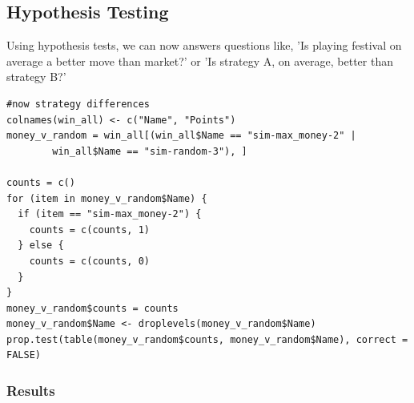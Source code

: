 \documentclass[11pt, oneside]{article}   	%
\begin{document}
\subsection{Hypothesis Testing}

Using hypothesis tests, we can now answers questions like, 'Is playing festival on average a better move than market?' or 'Is strategy A, on average, better than strategy B?'

\begin{verbatim}
#now strategy differences
colnames(win_all) <- c("Name", "Points")
money_v_random = win_all[(win_all$Name == "sim-max_money-2" | 
		win_all$Name == "sim-random-3"), ]

counts = c()
for (item in money_v_random$Name) {
  if (item == "sim-max_money-2") {
    counts = c(counts, 1)
  } else {
    counts = c(counts, 0)
  }
}
money_v_random$counts = counts
money_v_random$Name <- droplevels(money_v_random$Name)
prop.test(table(money_v_random$counts, money_v_random$Name), correct = FALSE)
\end{verbatim}

\subsubsection{Results}

\begin{figure}[H] \centering
   \begin{minipage}{0.49\textwidth}
   \end{minipage}
   \begin {minipage}{0.49\textwidth}
   \end{minipage}
\end{figure}
\end{document}

